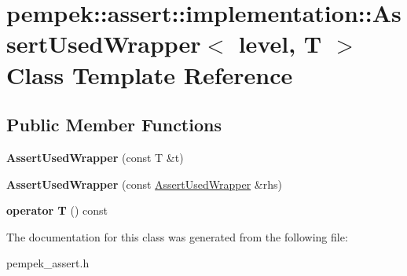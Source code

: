\hypertarget{classpempek_1_1assert_1_1implementation_1_1_assert_used_wrapper}{}\section{pempek\+:\+:assert\+:\+:implementation\+:\+:Assert\+Used\+Wrapper$<$ level, T $>$ Class Template Reference}
\label{classpempek_1_1assert_1_1implementation_1_1_assert_used_wrapper}
\subsection*{Public Member Functions}
\begin{DoxyCompactItemize}
\item 
\hypertarget{classpempek_1_1assert_1_1implementation_1_1_assert_used_wrapper_aaf36c43b8b324cbca6da4575fb62035b}{}{\bfseries Assert\+Used\+Wrapper} (const T \&t)\label{classpempek_1_1assert_1_1implementation_1_1_assert_used_wrapper_aaf36c43b8b324cbca6da4575fb62035b}

\item 
\hypertarget{classpempek_1_1assert_1_1implementation_1_1_assert_used_wrapper_a4321d58f4022100557ac9fa4ecd7abcf}{}{\bfseries Assert\+Used\+Wrapper} (const \hyperlink{classpempek_1_1assert_1_1implementation_1_1_assert_used_wrapper}{Assert\+Used\+Wrapper} \&rhs)\label{classpempek_1_1assert_1_1implementation_1_1_assert_used_wrapper_a4321d58f4022100557ac9fa4ecd7abcf}

\item 
\hypertarget{classpempek_1_1assert_1_1implementation_1_1_assert_used_wrapper_aac8d651b2e642c4f133eb5c5c0883d06}{}{\bfseries operator T} () const \label{classpempek_1_1assert_1_1implementation_1_1_assert_used_wrapper_aac8d651b2e642c4f133eb5c5c0883d06}

\end{DoxyCompactItemize}


The documentation for this class was generated from the following file\+:\begin{DoxyCompactItemize}
\item 
pempek\+\_\+assert.\+h\end{DoxyCompactItemize}
